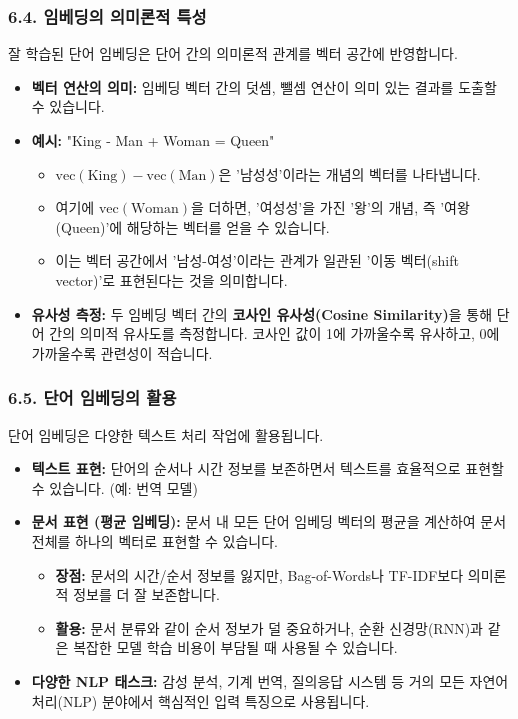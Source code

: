 \documentclass[11pt,a4paper]{article}
\begin{document}
\subsubsection*{6.4. 임베딩의 의미론적 특성}
잘 학습된 단어 임베딩은 단어 간의 의미론적 관계를 벡터 공간에 반영합니다.

\begin{itemize}
    \item \textbf{벡터 연산의 의미:} 임베딩 벡터 간의 덧셈, 뺄셈 연산이 의미 있는 결과를 도출할 수 있습니다.
    \item \textbf{예시:} "King - Man + Woman = Queen"
        \begin{itemize}
            \item $\text{vec}(\text{King}) - \text{vec}(\text{Man})$은 '남성성'이라는 개념의 벡터를 나타냅니다.
            \item 여기에 $\text{vec}(\text{Woman})$을 더하면, '여성성'을 가진 '왕'의 개념, 즉 '여왕(Queen)'에 해당하는 벡터를 얻을 수 있습니다.
            \item 이는 벡터 공간에서 '남성-여성'이라는 관계가 일관된 '이동 벡터(shift vector)'로 표현된다는 것을 의미합니다.
        \end{itemize}
    \item \textbf{유사성 측정:} 두 임베딩 벡터 간의 \textbf{코사인 유사성(Cosine Similarity)}을 통해 단어 간의 의미적 유사도를 측정합니다. 코사인 값이 1에 가까울수록 유사하고, 0에 가까울수록 관련성이 적습니다.
\end{itemize}

\subsubsection*{6.5. 단어 임베딩의 활용}
단어 임베딩은 다양한 텍스트 처리 작업에 활용됩니다.

\begin{itemize}
    \item \textbf{텍스트 표현:} 단어의 순서나 시간 정보를 보존하면서 텍스트를 효율적으로 표현할 수 있습니다. (예: 번역 모델)
    \item \textbf{문서 표현 (평균 임베딩):} 문서 내 모든 단어 임베딩 벡터의 평균을 계산하여 문서 전체를 하나의 벡터로 표현할 수 있습니다.
        \begin{itemize}
            \item \textbf{장점:} 문서의 시간/순서 정보를 잃지만, Bag-of-Words나 TF-IDF보다 의미론적 정보를 더 잘 보존합니다.
            \item \textbf{활용:} 문서 분류와 같이 순서 정보가 덜 중요하거나, 순환 신경망(RNN)과 같은 복잡한 모델 학습 비용이 부담될 때 사용될 수 있습니다.
        \end{itemize}
    \item \textbf{다양한 NLP 태스크:} 감성 분석, 기계 번역, 질의응답 시스템 등 거의 모든 자연어 처리(NLP) 분야에서 핵심적인 입력 특징으로 사용됩니다.
\end{itemize}
\end{document}
